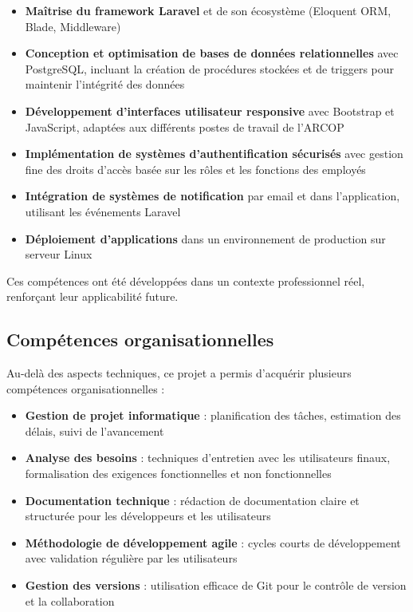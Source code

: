 \begin{itemize}
    \item \textbf{Maîtrise du framework Laravel} et de son écosystème (Eloquent ORM, Blade, Middleware)
    
    \item \textbf{Conception et optimisation de bases de données relationnelles} avec PostgreSQL, incluant la création de procédures stockées et de triggers pour maintenir l'intégrité des données
    
    \item \textbf{Développement d'interfaces utilisateur responsive} avec Bootstrap et JavaScript, adaptées aux différents postes de travail de l'ARCOP
    
    \item \textbf{Implémentation de systèmes d'authentification sécurisés} avec gestion fine des droits d'accès basée sur les rôles et les fonctions des employés
    
    \item \textbf{Intégration de systèmes de notification} par email et dans l'application, utilisant les événements Laravel
    
    \item \textbf{Déploiement d'applications} dans un environnement de production sur serveur Linux
\end{itemize}

Ces compétences ont été développées dans un contexte professionnel réel, renforçant leur applicabilité future.

\subsection{Compétences organisationnelles}
Au-delà des aspects techniques, ce projet a permis d'acquérir plusieurs compétences organisationnelles :

\begin{itemize}
    \item \textbf{Gestion de projet informatique} : planification des tâches, estimation des délais, suivi de l'avancement
    
    \item \textbf{Analyse des besoins} : techniques d'entretien avec les utilisateurs finaux, formalisation des exigences fonctionnelles et non fonctionnelles
    
    \item \textbf{Documentation technique} : rédaction de documentation claire et structurée pour les développeurs et les utilisateurs
    
    \item \textbf{Méthodologie de développement agile} : cycles courts de développement avec validation régulière par les utilisateurs
    
    \item \textbf{Gestion des versions} : utilisation efficace de Git pour le contrôle de version et la collaboration
\end{itemize}

